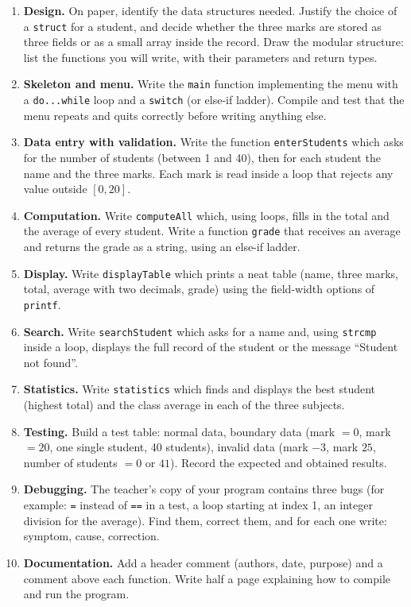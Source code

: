 \documentclass[11pt]{article}
\begin{document}
\begin{enumerate}
\item \textbf{Design.} On paper, identify the data structures needed. Justify the choice of a \texttt{struct} for a student, and decide whether the three marks are stored as three fields or as a small array inside the record. Draw the modular structure: list the functions you will write, with their parameters and return types.
\item \textbf{Skeleton and menu.} Write the \texttt{main} function implementing the menu with a \texttt{do...while} loop and a \texttt{switch} (or else-if ladder). Compile and test that the menu repeats and quits correctly before writing anything else.
\item \textbf{Data entry with validation.} Write the function \texttt{enterStudents} which asks for the number of students (between 1 and 40), then for each student the name and the three marks. Each mark is read inside a loop that rejects any value outside $[0, 20]$.
\item \textbf{Computation.} Write \texttt{computeAll} which, using loops, fills in the total and the average of every student. Write a function \texttt{grade} that receives an average and returns the grade as a string, using an else-if ladder.
\item \textbf{Display.} Write \texttt{displayTable} which prints a neat table (name, three marks, total, average with two decimals, grade) using the field-width options of \texttt{printf}.
\item \textbf{Search.} Write \texttt{searchStudent} which asks for a name and, using \texttt{strcmp} inside a loop, displays the full record of the student or the message ``Student not found''.
\item \textbf{Statistics.} Write \texttt{statistics} which finds and displays the best student (highest total) and the class average in each of the three subjects.
\item \textbf{Testing.} Build a test table: normal data, boundary data (mark $= 0$, mark $= 20$, one single student, 40 students), invalid data (mark $-3$, mark $25$, number of students $= 0$ or $41$). Record the expected and obtained results.
\item \textbf{Debugging.} The teacher's copy of your program contains three bugs (for example: \texttt{=} instead of \texttt{==} in a test, a loop starting at index 1, an integer division for the average). Find them, correct them, and for each one write: symptom, cause, correction.
\item \textbf{Documentation.} Add a header comment (authors, date, purpose) and a comment above each function. Write half a page explaining how to compile and run the program.
\end{enumerate}
\end{document}
